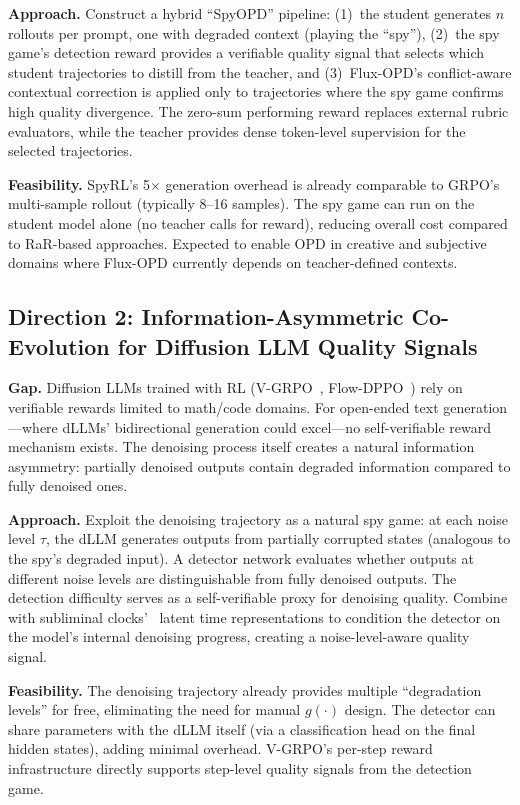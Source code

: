 \documentclass[11pt,a4paper]{article}
\begin{document}
\textbf{Approach.} Construct a hybrid ``SpyOPD'' pipeline: (1)~the student generates $n$ rollouts per prompt, one with degraded context (playing the ``spy''), (2)~the spy game's detection reward provides a verifiable quality signal that selects which student trajectories to distill from the teacher, and (3)~Flux-OPD's conflict-aware contextual correction is applied only to trajectories where the spy game confirms high quality divergence. The zero-sum performing reward replaces external rubric evaluators, while the teacher provides dense token-level supervision for the selected trajectories.

\textbf{Feasibility.} SpyRL's 5$\times$ generation overhead is already comparable to GRPO's multi-sample rollout (typically 8--16 samples). The spy game can run on the student model alone (no teacher calls for reward), reducing overall cost compared to RaR-based approaches. Expected to enable OPD in creative and subjective domains where Flux-OPD currently depends on teacher-defined contexts.

\subsection{Direction 2: Information-Asymmetric Co-Evolution for Diffusion LLM Quality Signals}

\textbf{Gap.} Diffusion LLMs trained with RL (V-GRPO~\cite{vgrpo2026}, Flow-DPPO~\cite{flowdppo2026}) rely on verifiable rewards limited to math/code domains. For open-ended text generation---where dLLMs' bidirectional generation could excel---no self-verifiable reward mechanism exists. The denoising process itself creates a natural information asymmetry: partially denoised outputs contain degraded information compared to fully denoised ones.

\textbf{Approach.} Exploit the denoising trajectory as a natural spy game: at each noise level $\tau$, the dLLM generates outputs from partially corrupted states (analogous to the spy's degraded input). A detector network evaluates whether outputs at different noise levels are distinguishable from fully denoised outputs. The detection difficulty serves as a self-verifiable proxy for denoising quality. Combine with subliminal clocks'~\cite{subliminalclocks2026} latent time representations to condition the detector on the model's internal denoising progress, creating a noise-level-aware quality signal.

\textbf{Feasibility.} The denoising trajectory already provides multiple ``degradation levels'' for free, eliminating the need for manual $g(\cdot)$ design. The detector can share parameters with the dLLM itself (via a classification head on the final hidden states), adding minimal overhead. V-GRPO's per-step reward infrastructure directly supports step-level quality signals from the detection game.
\end{document}
